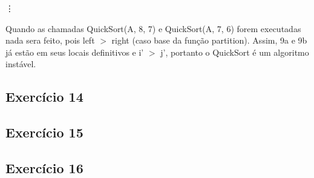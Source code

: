 \begin{tabbing}
\hspace{1em} \vdots
\end{tabbing}

Quando as chamadas QuickSort(A, 8, 7) e QuickSort(A, 7, 6) forem executadas nada sera feito, pois
left $>$ right (caso base da função partition). Assim, 9a e 9b já estão em seus locais 
definitivos e i' $>$ j', portanto o QuickSort é um algoritmo instável.

\subsection{Exercício 14}\label{sec:exer14}



\subsection{Exercício 15}\label{sec:exer15}

\subsection{Exercício 16}\label{sec:exer16}
